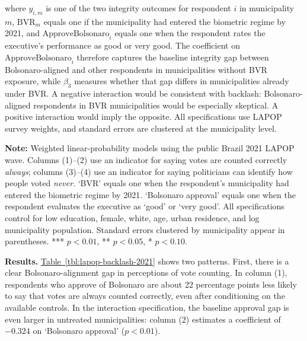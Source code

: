 where $y_{i,m}$ is one of the two integrity outcomes for respondent $i$ in municipality $m$, $\text{BVR}_m$ equals one if the municipality had entered the biometric regime by 2021, and $\text{ApproveBolsonaro}_i$ equals one when the respondent rates the executive's performance as good or very good. The coefficient on $\text{ApproveBolsonaro}_i$ therefore captures the baseline integrity gap between Bolsonaro-aligned and other respondents in municipalities without BVR exposure, while $\beta_3$ measures whether that gap differs in municipalities already under BVR. A negative interaction would be consistent with backlash: Bolsonaro-aligned respondents in BVR municipalities would be especially skeptical. A positive interaction would imply the opposite. All specifications use LAPOP survey weights, and standard errors are clustered at the municipality level.

\begin{table}[ht]
    \caption{Backlash and electoral-integrity regressions, LAPOP Brazil 2021}
    \label{tbl:lapop-backlash-2021}
    \begin{minipage}{\textwidth}
        {\footnotesize \textbf{Note:} Weighted linear-probability models using the public Brazil 2021 LAPOP wave. Columns (1)--(2) use an indicator for saying votes are counted correctly \emph{always}; columns (3)--(4) use an indicator for saying politicians can identify how people voted \emph{never}. `BVR' equals one when the respondent's municipality had entered the biometric regime by 2021. `Bolsonaro approval' equals one when the respondent evaluates the executive as `good' or `very good'. All specifications control for low education, female, white, age, urban residence, and log municipality population. Standard errors clustered by municipality appear in parentheses. *** $p<0.01$, ** $p<0.05$, * $p<0.10$. \par}
    \end{minipage}
\end{table}

\textbf{Results.} \hyperref[tbl:lapop-backlash-2021]{Table~\ref*{tbl:lapop-backlash-2021}} shows two patterns. First, there is a clear Bolsonaro-alignment gap in perceptions of vote counting. In column (1), respondents who approve of Bolsonaro are about 22 percentage points less likely to say that votes are always counted correctly, even after conditioning on the available controls. In the interaction specification, the baseline approval gap is even larger in untreated municipalities: column (2) estimates a coefficient of $-0.324$ on `Bolsonaro approval' ($p<0.01$).

